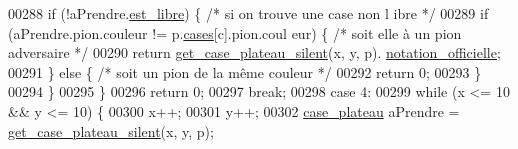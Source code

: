 \begin{DoxyCode}
00288                         \textcolor{keywordflow}{if} (!aPrendre.\hyperlink{structcase__plateau_a173f25d2fd7c653d77ca8174ba4f636d}{est_libre}) \{ \textcolor{comment}{/* si on trouve une case non l
      ibre */}
00289                                 \textcolor{keywordflow}{if} (aPrendre.pion.couleur != p.\hyperlink{structplateau_a6afaa60f594542e0d742b0c6d3223392}{cases}[c].pion.coul
      eur) \{ \textcolor{comment}{/* soit elle à un pion adversaire */}
00290                                         \textcolor{keywordflow}{return} \hyperlink{plateau_8h_a60a8f706865d0ae9087f8d65d4667655}{get_case_plateau_silent}(x, y, p).
      \hyperlink{structcase__plateau_ad510581b324604a9cf685cbb769a421a}{notation_officielle};
00291                                 \} \textcolor{keywordflow}{else} \{ \textcolor{comment}{/* soit un pion de la même couleur */}
00292                                         \textcolor{keywordflow}{return} 0;
00293                                 \}
00294                         \}
00295                 \}
00296                 \textcolor{keywordflow}{return} 0;
00297                 \textcolor{keywordflow}{break};
00298         \textcolor{keywordflow}{case} 4:
00299                 \textcolor{keywordflow}{while} (x <= 10 && y <= 10) \{
00300                         x++;
00301                         y++;
00302                         \hyperlink{structcase__plateau}{case_plateau} aPrendre = \hyperlink{plateau_8h_a60a8f706865d0ae9087f8d65d4667655}{get_case_plateau_silent}(x, y, p);
      

\end{DoxyCode}
